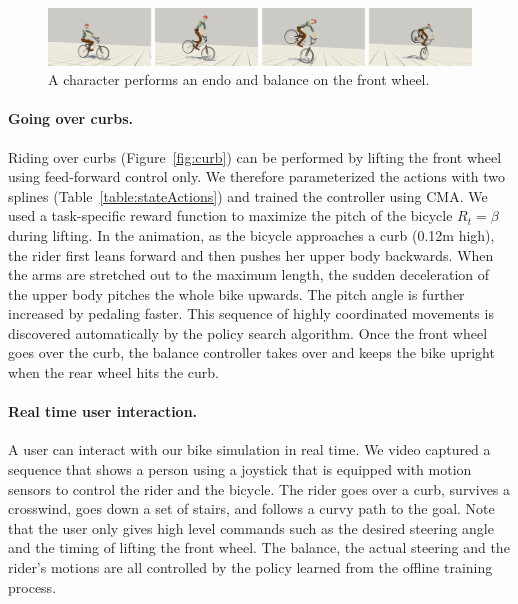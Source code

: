 \begin{figure}[!t]
\centering
\includegraphics[width=\textwidth]{figures/endo}
\caption{A character performs an endo and balance on the front wheel.}
\label{fig:endo}
\end{figure}

\paragraph{Going over curbs.} Riding over curbs (Figure~\ref{fig:curb}) can be performed by lifting the front wheel using feed-forward control only. We therefore parameterized the actions with two splines (Table~\ref{table:stateActions}) and trained the controller using CMA. We used a task-specific reward function to maximize the pitch of the bicycle $R_t = \beta$ during lifting. In the animation, as the bicycle approaches a curb (0.12m high), the rider first leans forward and then pushes her upper body backwards. When the arms are stretched out to the maximum length, the sudden deceleration of the upper body pitches the whole bike upwards. The pitch angle is further increased by pedaling faster. This sequence of highly coordinated movements is discovered automatically by the policy search algorithm. Once the front wheel goes over the curb, the balance controller takes over and keeps the bike upright when the rear wheel hits the curb.

\paragraph{Real time user interaction.} A user can interact with our bike simulation in real time. We video captured a sequence that shows a person using a joystick that is equipped with motion sensors to control the rider and the bicycle. The rider goes over a curb, survives a crosswind, goes down a set of stairs, and follows a curvy path to the goal. Note that the user only gives high level commands such as the desired steering angle and the timing of lifting the front wheel. The balance, the actual steering and the rider's motions are all controlled by the policy learned from the offline training process.

